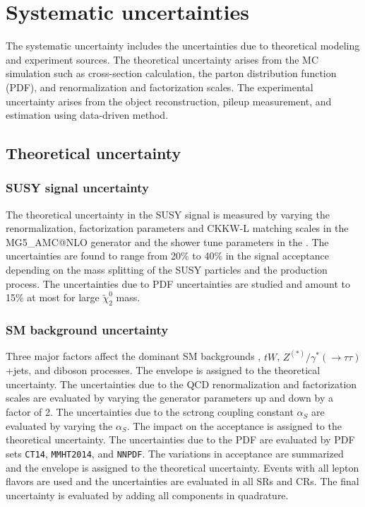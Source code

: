 
\section{Systematic uncertainties}
\label{sec:bkg_systematic_uncertainties}
The systematic uncertainty includes the uncertainties due to theoretical modeling and experiment sources.
The theoretical uncertainty arises from the MC simulation such as cross-section calculation, the parton distribution function (PDF), and renormalization and factorization scales.
The experimental uncertainty arises from the object reconstruction, pileup measurement, and estimation using data-driven method.


\subsection{Theoretical uncertainty}
\label{subsec:bkg_theoretical_uncertainty}


\subsubsection{SUSY signal uncertainty}
\label{subsubsec:bkg_susy_signal_uncertainty}
The theoretical uncertainty in the SUSY signal is measured by varying the renormalization, factorization parameters and CKKW-L matching scales in the MG5\_{\scriptsize A}MC@NLO
generator and the shower tune parameters in the {\PYTHIA}.
The uncertainties are found to range from 20\% to 40\% in the signal acceptance depending on the mass splitting of the SUSY particles and the production process.
The uncertainties due to PDF uncertainties are studied and amount to 15\% at most for large $\widetilde{\chi}^{0}_{2}$ mass.


\subsubsection{SM background uncertainty}
\label{subsubsec:bkg_sm_bkg_uncertainty}
Three major factors affect the dominant SM backgrounds \ttbar, $tW$, $Z^{(*)}/\gamma^{*}(\to \tau \tau)$+jets, and diboson processes.
The envelope is assigned to the theoretical uncertainty.
The uncertainties due to the QCD renormalization and factorization scales are evaluated by varying the generator parameters up and down by a factor of 2.
The uncertainties due to the sctrong coupling constant $\alpha_{S}$ are evaluated by varying the $\alpha_{S}$.
The impact on the acceptance is assigned to the theoretical uncertainty.
The uncertainties due to the PDF are evaluated by PDF sets \texttt{CT14}, \texttt{MMHT2014}, and \texttt{NNPDF}.
The variations in acceptance are summarized and the envelope is assigned to the theoretical uncertainty.
Events with all lepton flavors are used and the uncertainties are evaluated in all SRs and CRs.
The final uncertainty is evaluated by adding all components in quadrature.


